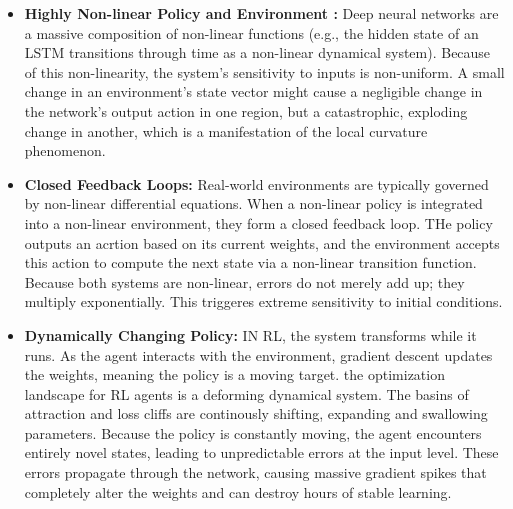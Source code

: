 \documentclass[11pt,a4paper]{article}
\begin{document}
\begin{itemize}
    \item \textbf{Highly Non-linear Policy and Environment :} Deep neural networks are a massive composition of non-linear functions (e.g., the hidden state of an LSTM transitions through time as a non-linear dynamical system). Because of this non-linearity, the system's sensitivity to inputs is non-uniform. A small change in an environment's state vector might cause a negligible change in the network's output action in one region, but a catastrophic, exploding change in another, which is a manifestation of the local curvature phenomenon. 
    \item \textbf{Closed Feedback Loops: } Real-world environments are typically governed by non-linear differential equations. When a non-linear policy is integrated into a non-linear environment, they form a closed feedback loop. THe policy outputs an acrtion based on its current weights, and the environment accepts this action to compute the next state via a non-linear transition function. Because both systems are non-linear, errors do not merely add up; they multiply exponentially. This triggeres extreme sensitivity to initial conditions. 
    \item \textbf{Dynamically Changing Policy: } IN RL, the system transforms while it runs. As the agent interacts with the environment, gradient descent updates the weights, meaning the policy is a moving target. the optimization landscape for RL agents is a deforming dynamical system. The  basins of attraction and loss cliffs are continously shifting, expanding and swallowing parameters. Because the policy is constantly moving, the agent encounters entirely novel states, leading to unpredictable errors at the input level. These errors propagate through the network, causing massive gradient spikes that completely alter the weights and can destroy hours of stable learning. 
\end{itemize}
\end{document}
